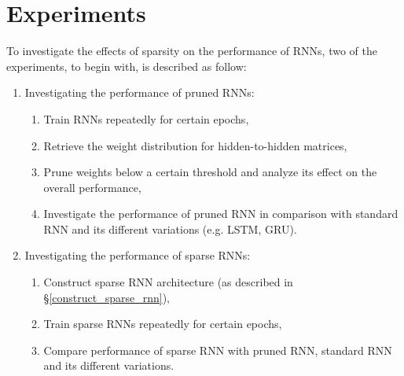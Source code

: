 \documentclass[acmlarge,screen,natbib=false]{acmart}
\begin{document}
\section{Experiments}
To investigate the effects of sparsity on the performance of RNNs, two of the experiments, to begin with, is described as follow:
\begin{enumerate}[	1.]
	\item Investigating the performance of pruned RNNs:
	\begin{enumerate}[-]
		\item Train RNNs repeatedly for certain epochs,
		\item Retrieve the weight distribution for hidden-to-hidden matrices,
		\item Prune weights below a certain threshold and analyze its effect on the overall performance,
		\item Investigate the performance of pruned RNN in comparison with standard RNN and its different variations (e.g. LSTM, GRU).
	\end{enumerate}
	\item Investigating the performance of sparse RNNs:
	\begin{enumerate}[-]
		\item Construct sparse RNN architecture (as described in \S\ref{construct_sparse_rnn}),
		\item Train sparse RNNs repeatedly for certain epochs,
		\item Compare performance of sparse RNN with pruned RNN, standard RNN and its different variations.
	\end{enumerate}
\end{enumerate}

\end{document}
